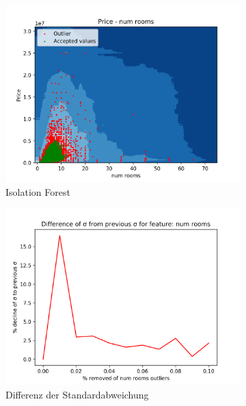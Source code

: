 \begin{figure}[h]
\begin{subfigure}{.5\textwidth}
  \includegraphics[width=\linewidth]{images/anhang/outlier_detection/num_rooms_IsolationForest.png}
  \caption{Isolation Forest}
\end{subfigure}
\begin{subfigure}{.5\textwidth}
  \centering
  \includegraphics[width=\linewidth]{images/anhang/outlier_detection/num_rooms_diff_of_std.png}
  \caption{Differenz der Standardabweichung}
\end{subfigure}
\begin{subfigure}{.5\textwidth}
  \centering

\end{subfigure}
\end{figure}
